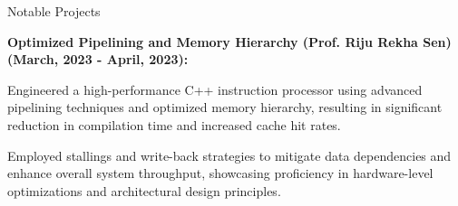 \begin{rubric}{Notable Projects}

    \entry*
    \textbf{Optimized Pipelining and Memory Hierarchy (Prof. Riju Rekha Sen) (March, 2023 - April, 2023):}\par
    Engineered a high-performance C++ instruction processor using advanced pipelining techniques and optimized memory hierarchy, resulting in significant reduction in compilation time and increased cache hit rates.\par
    Employed stallings and write-back strategies to mitigate data dependencies and enhance overall system throughput, showcasing proficiency in hardware-level optimizations and architectural design principles.

\end{rubric}
